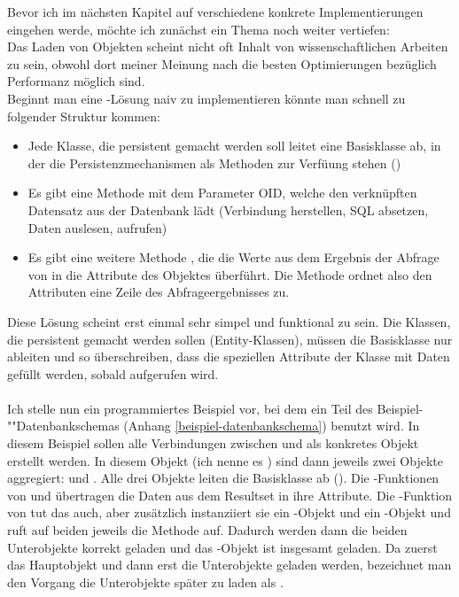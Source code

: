 Bevor ich im nächsten Kapitel auf verschiedene konkrete Implementierungen eingehen werde, möchte ich zunächst ein Thema noch weiter vertiefen:\\
Das Laden von Objekten scheint nicht oft Inhalt von wissenschaftlichen Arbeiten zu sein, obwohl dort meiner Meinung nach die besten Optimierungen bezüglich Performanz möglich sind. \\
Beginnt man eine \ORM-Lösung naiv zu implementieren könnte man schnell zu folgender Struktur kommen:\\
\begin{itemize}
\item Jede Klasse, die persistent gemacht werden soll leitet eine Basisklasse ab, in der die Persistenzmechanismen als Methoden zur Verfüung stehen ()
\item Es gibt eine Methode  mit dem Parameter OID, welche den verknüpften Datensatz aus der Datenbank lädt (Verbindung herstellen, SQL absetzen, Daten auslesen,  aufrufen)
\item Es gibt eine weitere Methode , die die Werte aus dem Ergebnis der Abfrage von  in die Attribute des Objektes überführt. Die Methode  ordnet also den Attributen eine Zeile des Abfrageergebnisses zu.
\end{itemize}
Diese Lösung scheint erst einmal sehr simpel und funktional zu sein. Die Klassen, die persistent gemacht werden sollen (Entity-Klassen), müssen die Basisklasse nur ableiten und  so überschreiben, dass die speziellen Attribute der Klasse mit Daten gefüllt werden, sobald  aufgerufen wird.\\
\\
Ich stelle nun ein programmiertes Beispiel vor, bei dem ein Teil des Bei\-spiel-""Daten\-bank\-schemas (Anhang \ref{beispiel-datenbankschema}) benutzt wird. In diesem Beispiel sollen alle Verbindungen zwischen  und  als konkretes Objekt erstellt werden. In diesem Objekt (ich nenne es ) sind dann jeweils zwei Objekte aggregiert:  und . Alle drei Objekte leiten die Basisklasse ab (). Die -Funktionen von  und  übertragen die Daten aus dem Resultset in ihre Attribute. Die -Funktion von  tut das auch, aber zusätzlich instanziiert sie ein -Objekt und ein -Objekt und ruft auf beiden jeweils die  Methode auf. Dadurch werden dann die beiden Unterobjekte korrekt geladen und das -Objekt ist insgesamt geladen. Da zuerst das Hauptobjekt und dann erst die Unterobjekte geladen werden, bezeichnet man den Vorgang die Unterobjekte später zu laden als . \\%

